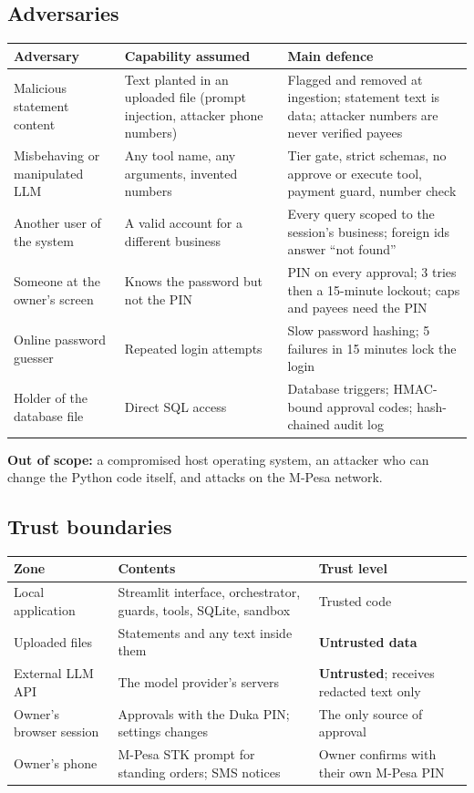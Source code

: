 \documentclass[10pt,a4paper]{article}
\begin{document}
\subsection{Adversaries}
\begin{center}
\begin{tabularx}{\textwidth}{@{}L{3.4cm}L{4.6cm}Y@{}}
\toprule
\textbf{Adversary} & \textbf{Capability assumed} & \textbf{Main defence}\\
\midrule
Malicious statement content & Text planted in an uploaded file (prompt injection, attacker phone numbers) & Flagged and removed at ingestion; statement text is data; attacker numbers are never verified payees\\
Misbehaving or manipulated LLM & Any tool name, any arguments, invented numbers & Tier gate, strict schemas, no approve or execute tool, payment guard, number check\\
Another user of the system & A valid account for a different business & Every query scoped to the session's business; foreign ids answer ``not found''\\
Someone at the owner's screen & Knows the password but not the PIN & PIN on every approval; 3 tries then a 15-minute lockout; caps and payees need the PIN\\
Online password guesser & Repeated login attempts & Slow password hashing; 5 failures in 15 minutes lock the login\\
Holder of the database file & Direct SQL access & Database triggers; HMAC-bound approval codes; hash-chained audit log\\
\bottomrule
\end{tabularx}
\end{center}
\textbf{Out of scope:} a compromised host operating system, an attacker who can change the Python code itself, and attacks on the M-Pesa network.

\subsection{Trust boundaries}
\begin{center}
\begin{tabularx}{\textwidth}{@{}L{3.6cm}YL{4.2cm}@{}}
\toprule
\textbf{Zone} & \textbf{Contents} & \textbf{Trust level}\\
\midrule
Local application & Streamlit interface, orchestrator, guards, tools, SQLite, sandbox & Trusted code\\
Uploaded files & Statements and any text inside them & \textbf{Untrusted data}\\
External LLM API & The model provider's servers & \textbf{Untrusted}; receives redacted text only\\
Owner's browser session & Approvals with the Duka PIN; settings changes & The only source of approval\\
Owner's phone & M-Pesa STK prompt for standing orders; SMS notices & Owner confirms with their own M-Pesa PIN\\
\bottomrule
\end{tabularx}
\end{center}
\end{document}
